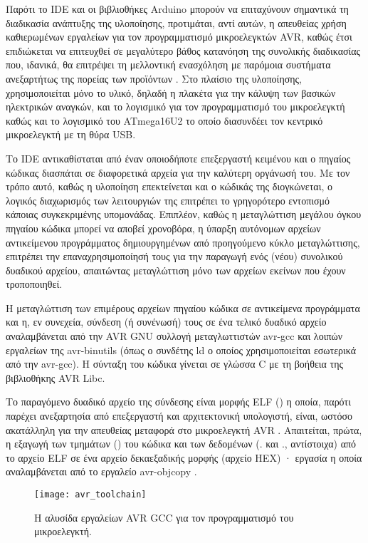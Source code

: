 Παρότι το IDE και οι βιβλιοθήκες Arduino μπορούν να επιταχύνουν σημαντικά τη
διαδικασία ανάπτυξης της υλοποίησης, προτιμάται, αντί αυτών, η απευθείας χρήση
καθιερωμένων εργαλείων για τον προγραμματισμό μικροελεγκτών AVR, καθώς έτσι
επιδιώκεται να επιτευχθεί σε μεγαλύτερο βάθος κατανόηση της συνολικής
διαδικασίας που, ιδανικά, θα επιτρέψει τη μελλοντική ενασχόληση με παρόμοια
συστήματα ανεξαρτήτως της πορείας των προϊόντων . Στο πλαίσιο της
υλοποίησης, χρησιμοποιείται μόνο το υλικό, δηλαδή η πλακέτα  για την
κάλυψη των βασικών ηλεκτρικών αναγκών, και το λογισμικό  για τον
προγραμματισμό του μικροελεγκτή καθώς και το λογισμικό του ATmega16U2 το οποίο
διασυνδέει τον κεντρικό μικροελεγκτή με τη θύρα USB.

Το IDE αντικαθίσταται από έναν οποιοδήποτε επεξεργαστή κειμένου και ο πηγαίος
κώδικας διασπάται σε διαφορετικά αρχεία για την καλύτερη οργάνωσή του.
Με τον τρόπο αυτό, καθώς η υλοποίηση επεκτείνεται και ο κώδικάς της διογκώνεται,
ο λογικός διαχωρισμός των λειτουργιών της επιτρέπει το γρηγορότερο εντοπισμό
κάποιας συγκεκριμένης υπομονάδας. Επιπλέον, καθώς η μεταγλώττιση μεγάλου όγκου
πηγαίου κώδικα μπορεί να αποβεί χρονοβόρα, η ύπαρξη αυτόνομων αρχείων
αντικείμενου προγράμματος δημιουργημένων από προηγούμενο κύκλο μεταγλώττισης,
επιτρέπει την επαναχρησιμοποίησή τους για την παραγωγή ενός (νέου) συνολικού
δυαδικού αρχείου, απαιτώντας μεταγλώττιση μόνο των αρχείων εκείνων που έχουν
τροποποιηθεί.

Η μεταγλώττιση των επιμέρους αρχείων πηγαίου κώδικα σε αντικείμενα προγράμματα
και η, εν συνεχεία, σύνδεση (ή συνένωσή) τους σε ένα τελικό δυαδικό αρχείο
αναλαμβάνεται από την AVR GNU συλλογή μεταγλωττιστών avr-gcc και λοιπών
εργαλείων της avr-binutils (όπως ο συνδέτης ld ο οποίος χρησιμοποιείται
εσωτερικά από την avr-gcc). Η σύνταξη του κώδικα γίνεται σε γλώσσα C με τη
βοήθεια της βιβλιοθήκης AVR Libc.

Το παραγόμενο δυαδικό αρχείο της σύνδεσης είναι μορφής ELF () η οποία, παρότι παρέχει ανεξαρτησία από επεξεργαστή και
αρχιτεκτονική υπολογιστή, είναι, ωστόσο ακατάλληλη για την απευθείας μεταφορά
στο μικροελεγκτή AVR \parencites[47]{cruz97}[346]{avrlibc}. Απαιτείται, πρώτα, η
εξαγωγή των τμημάτων () του κώδικα και των δεδομένων (\@.
και \@., αντίστοιχα) από το αρχείο ELF σε ένα αρχείο δεκαεξαδικής
μορφής (αρχείο HEX) · εργασία η οποία αναλαμβάνεται από το εργαλείο avr-objcopy
\parencite[13,346]{avrlibc}.

\begin{figure}
    \caption{Η αλυσίδα εργαλείων AVR GCC για τον προγραμματισμό του
    μικροελεγκτή.\label{fig:avr:toolchain}}
    \begin{center}
    \texttt{[image: avr\_toolchain]}
    \end{center}
\end{figure}


